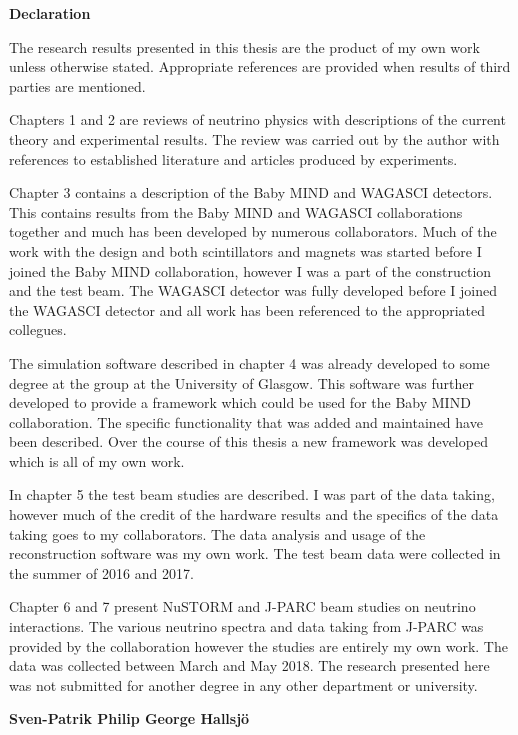 \vspace*{0.75in}
\begin{center} {\bf Declaration}\end{center}


The research results presented in this thesis are the product of my own work unless otherwise stated. Appropriate references are provided when results of third parties are mentioned. 

Chapters 1 and 2 are reviews of neutrino physics with descriptions of the current theory and experimental results. The review was carried out by the author with references to established literature and articles produced by experiments.

Chapter 3 contains a description of the Baby MIND and WAGASCI detectors. This contains results from the Baby MIND and WAGASCI collaborations together and much has been developed by numerous collaborators. Much of the work with the design and both scintillators and magnets was started before I joined the Baby MIND collaboration, however I was a part of the construction and the test beam. The WAGASCI detector was fully developed before I joined the WAGASCI detector and all work has been referenced to the appropriated collegues.

The simulation software described in chapter 4 was already developed to some degree at the group at the University of Glasgow. This software was further developed to provide a framework which could be used for the Baby MIND collaboration. The specific functionality that was added and maintained have been described. Over the course of this thesis a new framework was developed which is all of my own work.

In chapter 5 the test beam studies are described. I was part of the data taking, however much of the credit of the hardware results and the specifics of the data taking goes to my collaborators. The data analysis and usage of the reconstruction software was my own work. The test beam data were collected in the summer of 2016 and 2017.

Chapter 6 and 7 present NuSTORM and J-PARC beam studies on neutrino interactions. The various neutrino spectra and data taking from J-PARC was provided by the collaboration however the studies are entirely my own work. The data was collected between March and May 2018. The research presented here was not submitted for another degree in any other department or university.


\begin{flushright} \textbf{Sven-Patrik Philip George Hallsj{\"o}}\end{flushright}
